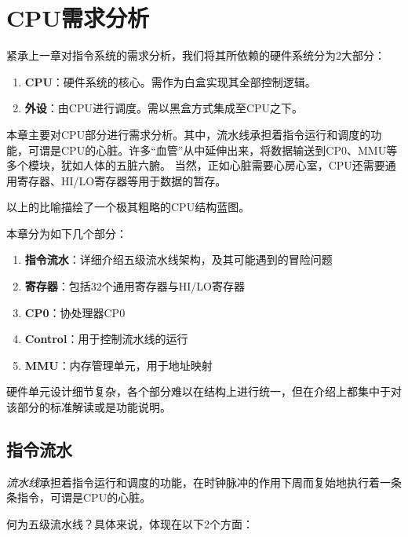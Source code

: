 \chapter{CPU需求分析}

紧承上一章对指令系统的需求分析，我们将其所依赖的硬件系统分为2大部分：

\begin{enumerate}
    \item {\bf CPU}：硬件系统的核心。需作为白盒实现其全部控制逻辑。
    \item {\bf 外设}：由CPU进行调度。需以黑盒方式集成至CPU之下。
\end{enumerate}

本章主要对CPU部分进行需求分析。其中，流水线承担着指令运行和调度的功能，可谓是CPU的心脏。许多``血管''从中延伸出来，将数据输送到CP0、MMU等多个模块，犹如人体的五脏六腑。
当然，正如心脏需要心房心室，CPU还需要通用寄存器、HI/LO寄存器等用于数据的暂存。

以上的比喻描绘了一个极其粗略的CPU结构蓝图。

本章分为如下几个部分：

\begin{enumerate}
    \item {\bf 指令流水}：详细介绍五级流水线架构，及其可能遇到的冒险问题
    \item {\bf 寄存器}：包括32个通用寄存器与HI/LO寄存器
    \item {\bf CP0}：协处理器CP0
    \item {\bf Control}：用于控制流水线的运行
    \item {\bf MMU}：内存管理单元，用于地址映射
\end{enumerate}

硬件单元设计细节复杂，各个部分难以在结构上进行统一，但在介绍上都集中于对该部分的标准解读或是功能说明。

\section{指令流水}

\emph{流水线}承担着指令运行和调度的功能，在时钟脉冲的作用下周而复始地执行着一条条指令，可谓是CPU的心脏。

何为五级流水线？具体来说，体现在以下2个方面：

